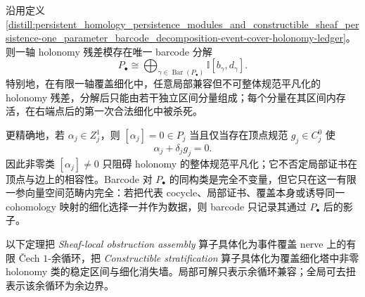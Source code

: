 \begin{theorem}\label{distill:persistent_homology_persistence_modules_and_constructible_sheaf_persistence-one_parameter_barcode_decomposition-event-cover-holonomy-interval-skeleton}
沿用定义 \ref{distill:persistent_homology_persistence_modules_and_constructible_sheaf_persistence-one_parameter_barcode_decomposition-event-cover-holonomy-ledger}。则一轴 holonomy 残差模存在唯一 barcode 分解
\[
P_\bullet\cong\bigoplus_{\gamma\in\operatorname{Bar}(P_\bullet)}\mathbb I[b_\gamma,d_\gamma].
\]
特别地，在有限一轴覆盖细化中，任意局部兼容但不可整体规范平凡化的 holonomy 残差，分解后只能由若干独立区间分量组成；每个分量在其区间内存活，在右端点后的第一次合法细化中被杀死。

更精确地，若 \(\alpha_j\in Z^1_j\)，则 \([\alpha_j]=0\in P_j\) 当且仅当存在顶点规范 \(g_j\in C^0_j\) 使
\[
\alpha_j+\delta_j g_j=0.
\]
因此非零类 \([\alpha_j]\ne0\) 只阻碍 holonomy 的整体规范平凡化；它不否定局部证书在顶点与边上的相容性。Barcode 对 \(P_\bullet\) 的同构类是完全不变量，但它只在这一有限一参向量空间范畴内完全：若把代表 cocycle、局部证书、覆盖本身或诱导同一 cohomology 映射的细化选择一并作为数据，则 barcode 只记录其通过 \(P_\bullet\) 后的影子。
\end{theorem}
\begin{remark}
以下定理把 \emph{Sheaf-local obstruction assembly} 算子具体化为事件覆盖 nerve 上的有限 \v Cech \(1\)-余循环，把 \emph{Constructible stratification} 算子具体化为覆盖细化塔中非零 holonomy 类的稳定区间与细化消失墙。局部可解只表示余循环兼容；全局可去扭表示该余循环为余边界。
\end{remark}

